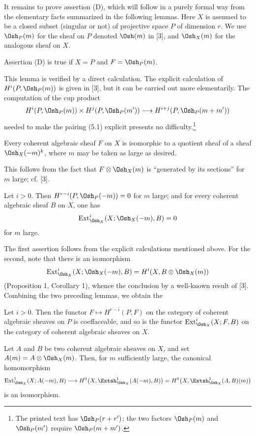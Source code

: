It remains to prove assertion (D), which will follow in a purely formal way
from the elementary facts summarized in the following lemmas. Here $X$ is
assumed to be a closed subset (singular or not) of projective space $P$ of
dimension $r$. We use $\Osh_P(m)$ for the sheaf on $P$ denoted $\Osh(m)$ in
[3], and $\Osh_X(m)$ for the analogous sheaf on $X$.

 Assertion (D) is true if $X=P$ and $F=\Osh_P(m)$.

This lemma is verified by a direct calculation. The explicit calculation of
$H^{i}(P,\Osh_P(m))$ is given in [3], but it can be carried out more
elementarily. The computation of the cup product
\[
  H^{i}(P,\Osh_P(m))\times H^{j}(P,\Osh_P(m'))
  \longrightarrow H^{i+j}(P,\Osh_P(m+m'))
\]
needed to make the pairing (5.1) explicit presents no
difficulty.\footnote{The printed text has $\Osh_P(r+r')$; the two factors
$\Osh_P(m)$ and $\Osh_P(m')$ require $\Osh_P(m+m')$.}

 Every coherent algebraic sheaf $F$ on $X$ is isomorphic to a
quotient sheaf of a sheaf $\Osh_X(-m)^{k}$, where $m$ may be taken as large as
desired.

This follows from the fact that $F\otimes\Osh_X(m)$ is ``generated by its
sections'' for $m$ large; cf. [3].

 Let $i>0$. Then
$H^{r-i}(P,\Osh_P(-m))=0$ for $m$ large; and for every coherent algebraic sheaf
$B$ on $X$, one has
\[
  \operatorname{Ext}_{\Osh_X}^{i}(X;\Osh_X(-m),B)=0
\]
for $m$ large.

The first assertion follows from the explicit calculations mentioned above.
For the second, note that there is an isomorphism
\[
  \operatorname{Ext}_{\Osh_X}^{i}(X;\Osh_X(-m),B)
  =H^{i}(X,B\otimes\Osh_X(m))
\]
(Proposition 1, Corollary 1), whence the conclusion by a well-known result of
[3]. Combining the two preceding lemmas, we obtain the

 Let $i>0$. Then the functor
$F\longmapsto H^{r-i}(P,F)$ on the category of coherent algebraic sheaves on
$P$ is coeffaceable, and so is the functor
$\operatorname{Ext}_{\Osh_X}^{i}(X;F,B)$ on the category of coherent algebraic
sheaves on $X$.

 Let $A$ and $B$ be two coherent algebraic sheaves on $X$, and
set $A(m)=A\otimes\Osh_X(m)$. Then, for $m$ sufficiently large, the canonical
homomorphism
\[
  \operatorname{Ext}_{\Osh_X}^{1}(X;A(-m),B)
  \longrightarrow H^{0}\bigl(X,\Extsh_{\Osh_X}^{1}(A(-m),B)\bigr)
  =H^{0}\bigl(X,\Extsh_{\Osh_X}^{1}(A,B)(m)\bigr)
\]
is an isomorphism.

